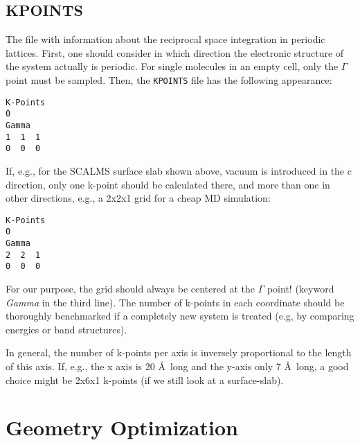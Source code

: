 \documentclass[a4paper,11pt]{article}
\begin{document}
\subsection{KPOINTS}

The file with information about the reciprocal space integration in periodic
lattices.
First, one should consider in which direction the electronic structure of the system 
actually is periodic. 
For single molecules in an empty cell, only the $\Gamma$ point must be sampled. Then, the 
\texttt{KPOINTS} file has the following appearance:

\begin{verbatim}
K-Points
0
Gamma
1  1  1
0  0  0
\end{verbatim}
       
If, e.g., for the SCALMS surface slab shown above, vacuum is introduced in the c direction,
only one k-point should be calculated there, and more than one in other directions, e.g., 
a 2x2x1 grid for a cheap MD simulation:
       
\begin{verbatim}
K-Points
0
Gamma
2  2  1
0  0  0
\end{verbatim}

For our purpose, the grid should always be centered at the $\Gamma$ point! (keyword \textit{Gamma}
in the third line).
The number of k-points in each coordinate should be thoroughly benchmarked if a completely new 
system is treated (e.g, by comparing energies or band structures).

In general, the number of k-points per axis is inversely proportional to the length
of this axis. If, e.g., the x axis is 20 \AA~long and the y-axis only 7 \AA~long, a
good choice might be 2x6x1 k-points (if we still look at a surface-slab).



\section{Geometry Optimization}
\end{document}
